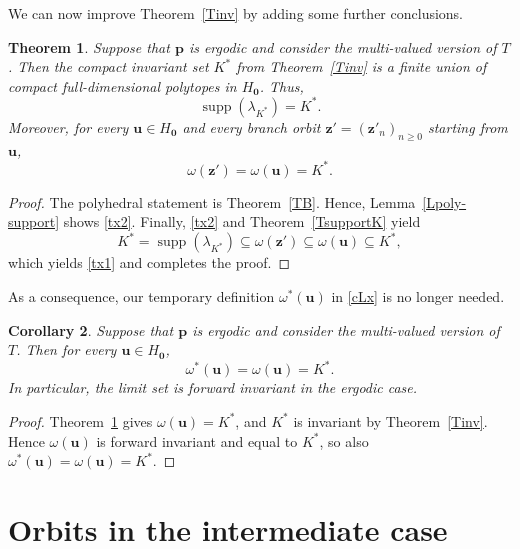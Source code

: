 \documentclass[11pt,reqno,tbtags,a4paper]{amsart}
\numberwithin{equation}{section}
\renewcommand\ge{\geq}
\renewcommand\geq{\geqslant}
\theoremstyle{plain}%
\newtheorem{theorem}{Theorem}[section]
\newtheorem{corollary}[theorem]{Corollary}
\theoremstyle{definition}
\theoremstyle{remark}
\newcommand{\refT}[1]{Theorem~\ref{#1}}
\newcommand\supp{\operatorname{supp}}
\newcommand\gl{\lambda}
\newcommand\cL{{\omega}}
\newcommand\Ho{H_{\0}}
\newcommand\vp{\mathbf{p}}
\newcommand\vu{\mathbf{u}}
\newcommand\vz{\mathbf{z}}
\newcommand\cLx{\cL^*}
\newcommand\Kx{K^*}
\newcommand\0{{\boldsymbol 0}}
\newcommand\1{{\boldsymbol 1}}
\begin{document}
We can now improve \refT{Tinv} by adding some further conclusions.

\begin{theorem}\label{TX}
Suppose that $\vp$ is ergodic and consider the multi-valued version of $T$.
Then the compact invariant set $\Kx$
from Theorem~\ref{Tinv} is a finite
union of compact full-dimensional polytopes in $\Ho$.
Thus,
\begin{equation}\label{tx2}
\supp(\gl_{\Kx})=\Kx.
\end{equation}
Moreover, for every $\vu\in\Ho$ and every branch orbit
$\vz'=(\vz'_n)_{n\ge0}$ starting from $\vu$,
\begin{equation}\label{tx1}
\omega(\vz')=\cL(\vu)=\Kx.
\end{equation}
\end{theorem}

\begin{proof}
The polyhedral statement is Theorem~\ref{TB}. 
Hence, Lemma~\ref{Lpoly-support}
shows \eqref{tx2}.
Finally, \eqref{tx2}
and  Theorem~\ref{TsupportK} yield
\begin{equation}\label{ts24}
\Kx=\supp(\gl_{\Kx})
\subseteq
\omega(\vz')
\subseteq
\cL(\vu)
\subseteq
\Kx,
\end{equation}
which yields \eqref{tx1} and completes the proof.
\end{proof}

As a consequence, our temporary definition $\cLx(\vu)$ in \eqref{cLx} is no
longer needed.

\begin{corollary}\label{CTX}
Suppose that $\vp$ is ergodic and consider the multi-valued version of $T$.
Then for every $\vu\in\Ho$,
\begin{equation}\label{tx3}
\cLx(\vu)=\cL(\vu)=\Kx.
\end{equation}
In particular, the limit set is forward invariant in the ergodic case.
\end{corollary}

\begin{proof}
Theorem~\ref{TX} gives $\cL(\vu)=\Kx$, and $\Kx$ is invariant by
Theorem~\ref{Tinv}. Hence $\cL(\vu)$ is forward invariant and equal to
$\Kx$, so also $\cLx(\vu)=\cL(\vu)=\Kx$.
\end{proof}


\section{Orbits in the intermediate case}\label{Sinter}
\end{document}

